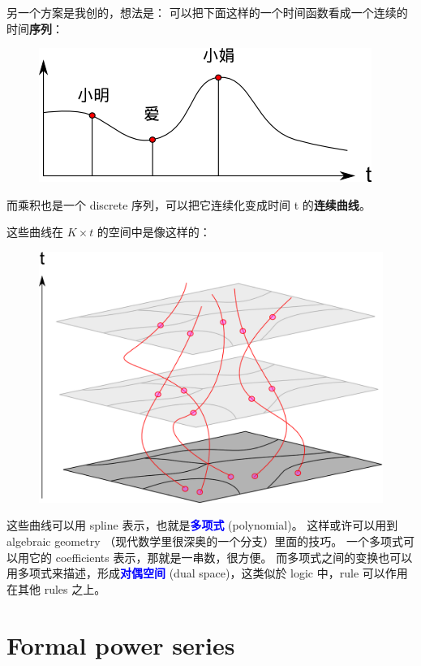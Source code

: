 \documentclass[12pt]{article}
\newcommand{\concept}[1]{\textbf{\textcolor{blue}{#1}}}
\begin{document}
另一个方案是我创的，想法是： 可以把下面这样的一个时间函数看成一个连续的时间\textbf{序列}：
\begin{figure}[H]
\centering
\includegraphics[scale=0.75]{continuous-time-sequence.png}
\end{figure}
而乘积也是一个 discrete 序列，可以把它连续化变成时间 t 的\textbf{连续曲线}。

这些曲线在 $K \times t$ 的空间中是像这样的：
\begin{figure}[H]
\centering
\includegraphics[scale=0.75]{polynomial-hairs.png}
\end{figure}

这些曲线可以用 spline 表示，也就是\concept{多项式} (polynomial)。  这样或许可以用到 algebraic geometry （现代数学里很深奥的一个分支）里面的技巧。  一个多项式可以用它的 coefficients 表示，那就是一串数，很方便。 而多项式之间的变换也可以用多项式来描述，形成\concept{对偶空间} (dual space)，这类似於 logic 中，rule 可以作用在其他 rules 之上。 

\section{Formal power series}
\end{document}
